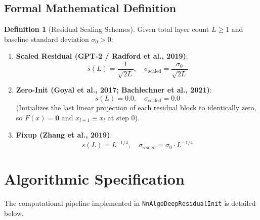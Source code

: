 \documentclass[11pt,a4paper]{article}
\theoremstyle{definition}
\newtheorem{definition}{Definition}[section]
\begin{document}
\subsection{Formal Mathematical Definition}
\begin{definition}[Residual Scaling Schemes]
Given total layer count $L \ge 1$ and baseline standard deviation $\sigma_0 > 0$:
\begin{enumerate}
    \item \textbf{Scaled Residual (GPT-2 / Radford et al., 2019)}:
    \begin{equation}
    s(L) = \frac{1}{\sqrt{2L}}, \quad \sigma_{\text{scaled}} = \frac{\sigma_0}{\sqrt{2L}} \label{eq:gpt2_scale}
    \end{equation}
    \item \textbf{Zero-Init (Goyal et al., 2017; Bachlechner et al., 2021)}:
    \begin{equation}
    s(L) = 0.0, \quad \sigma_{\text{scaled}} = 0.0 \label{eq:zero_init}
    \end{equation}
    (Initializes the last linear projection of each residual block to identically zero, so $F(x) = \mathbf{0}$ and $x_{l+1} \equiv x_l$ at step $0$).
    \item \textbf{Fixup (Zhang et al., 2019)}:
    \begin{equation}
    s(L) = L^{-1/4}, \quad \sigma_{\text{scaled}} = \sigma_0 \cdot L^{-1/4} \label{eq:fixup_scale}
    \end{equation}
\end{enumerate}
\end{definition}

\section{Algorithmic Specification}

The computational pipeline implemented in \texttt{NnAlgoDeepResidualInit} is detailed below.
\end{document}
